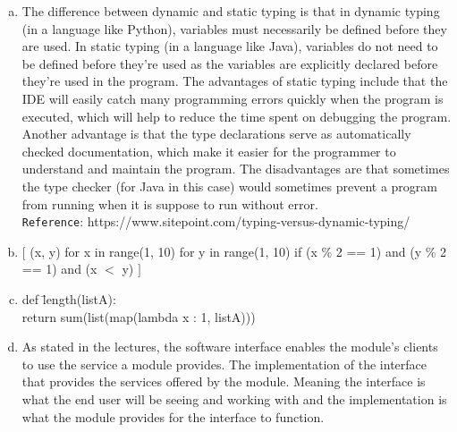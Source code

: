 \documentclass[12pt]{article}
\begin{document}
\begin{enumerate}[a)]
\item The difference between dynamic and static typing is that in dynamic typing (in a language like Python), variables must necessarily be defined before they are used. In static typing (in a language like Java), variables do not need to be defined before they’re used as the variables are explicitly declared before they’re used in the program. The advantages of static typing include that the IDE will easily catch many programming errors quickly when the program is executed, which will help to reduce the time spent on debugging the program. Another advantage is that the type declarations serve as automatically checked documentation, which make it easier for the programmer to understand and maintain the program. The disadvantages are that sometimes the type checker (for Java in this case) would sometimes prevent a program from running when it is suppose to run without error.\\

\texttt{Reference}: https://www.sitepoint.com/typing-versus-dynamic-typing/

\item $[$ (x, y) for x in range(1, 10) for y in range(1, 10) if (x \% 2 == 1) and  (y \% 2 == 1) and (x $<$ y) $]$
  
\item \begin{tabbing}
def \= length(listA):\\
	\> return sum(list(map(lambda x : 1, listA)))
\end{tabbing}

\item As stated in the lectures, the software interface enables the module’s clients to use the service a module provides. The implementation of the interface that provides the services offered by the module. Meaning the interface is what the end user will be seeing and working with and the implementation is what the module provides for the interface to function.


\end{enumerate}
\end{document}
